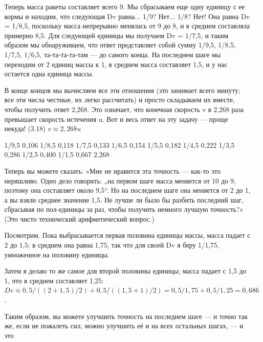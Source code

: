 \documentclass[10pt,oneside]{article}
\newcommand{\TipsRunning}[1]{\par\vspace{2bp}{\centering\footnotesize #1\par}\vspace{2bp}}
\begin{document}
\TipsRunning{З А Д А Ч И  И  Р Е Ш Е Н И Я • 1 0 3}

Теперь масса ракеты составляет всего 9. Мы сбрасываем еще одну единицу с ее кормы и находим, что следующая Dv равна... 1/9? Нет... 1/8? Нет! Она равна Dv = 1/8,5, поскольку масса непрерывно менялась от 9 до 8, и в среднем составляла примерно 8,5. Для следующей единицы мы получаем Dv = 1/7,5, и таким образом мы обнаруживаем, что ответ представляет собой сумму 1/9,5, 1/8,5, 1/7,5, 1/6,5, та-та-та-та-там --- до самого конца. На последнем шаге мы переходим от 2 единиц массы к 1, в среднем масса составляет 1,5, и у нас остается одна единица массы.\par

В конце концов мы вычисляем все эти отношения (это занимает всего минуту; все эти числа честные, их легко рассчитать) и просто складываем их вместе, чтобы получить ответ 2,268. Это означает, что конечная скорость v в 2,268 раза превышает скорость истечения u. Вот и весь ответ на эту задачу --- проще некуда! (3.18) \(v \approx 2,268 u\)\par

1/9,5   0,106 1/8,5   0,118 1/7,5   0,133 1/6,5   0,154 1/5,5   0,182 1/4,5   0,222 1/3,5   0,286 1/2,5   0,400 1/1,5   0,667 2,268\par

Теперь вы можете сказать: «Мне не нравится эта точность --- как-то это неряшливо. Одно дело говорить: „на первом шаге масса меняется от 10 до 9, поэтому она составляет около 9,5“. Но на последнем шаге она меняется от 2 до 1, а вы взяли среднее значение 1,5. Не лучше ли было бы разбить последний шаг, сбрасывая по пол-единицы за раз, чтобы получить немного лучшую точность?» (Это чисто технический арифметический вопрос.)\par

Посмотрим. Пока выбрасывается первая половина единицы массы, масса падает с 2 до 1,5; в среднем она равна 1,75, так что для своей Dv я беру 1/1,75, умноженное на половину единицы.\par

Затем я делаю то же самое для второй половины единицы; масса падает с 1,5 до 1, что в среднем составляет 1,25: \(Dv \approx 0,5 / ((2 + 1,5)/2) + 0,5 / ((1,5 + 1)/2) = 0,5 / 1,75 + 0,5 / 1,25 = 0,686\).\par

Таким образом, вы можете улучшить точность на последнем шаге --- и точно так же, если не пожалеть сил, можно улучшить её и на всех остальных шагах, --- и это\par
\end{document}
